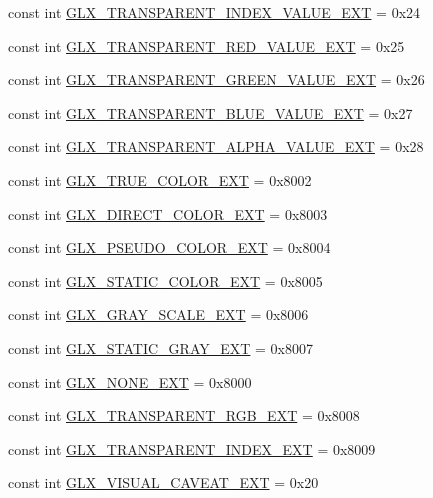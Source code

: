 \begin{DoxyCompactItemize}
const int \hyperlink{class_tao_1_1_platform_1_1_x11_1_1_glx_a1e8f3f9cf583863da934aadd55f7cc7c}{GLX\_\-TRANSPARENT\_\-INDEX\_\-VALUE\_\-EXT} = 0x24
\item 
const int \hyperlink{class_tao_1_1_platform_1_1_x11_1_1_glx_a8c0d163ec64d715d5ee60da7c9b008bc}{GLX\_\-TRANSPARENT\_\-RED\_\-VALUE\_\-EXT} = 0x25
\item 
const int \hyperlink{class_tao_1_1_platform_1_1_x11_1_1_glx_a687072d3336a0824a63a3204b5d0cd37}{GLX\_\-TRANSPARENT\_\-GREEN\_\-VALUE\_\-EXT} = 0x26
\item 
const int \hyperlink{class_tao_1_1_platform_1_1_x11_1_1_glx_a333ee7b32c4683b67f35a39b058c33bd}{GLX\_\-TRANSPARENT\_\-BLUE\_\-VALUE\_\-EXT} = 0x27
\item 
const int \hyperlink{class_tao_1_1_platform_1_1_x11_1_1_glx_ab4ac1b85364d8ebc68fc131daeacaa14}{GLX\_\-TRANSPARENT\_\-ALPHA\_\-VALUE\_\-EXT} = 0x28
\item 
const int \hyperlink{class_tao_1_1_platform_1_1_x11_1_1_glx_a9ccebdda70318edcdb01ec9040546701}{GLX\_\-TRUE\_\-COLOR\_\-EXT} = 0x8002
\item 
const int \hyperlink{class_tao_1_1_platform_1_1_x11_1_1_glx_ab31b0c872736b40dc162d5f05f171147}{GLX\_\-DIRECT\_\-COLOR\_\-EXT} = 0x8003
\item 
const int \hyperlink{class_tao_1_1_platform_1_1_x11_1_1_glx_a7e15ee0e44da343b4ea0eff6b8137a56}{GLX\_\-PSEUDO\_\-COLOR\_\-EXT} = 0x8004
\item 
const int \hyperlink{class_tao_1_1_platform_1_1_x11_1_1_glx_a1eab7def5d1f9ca7f7ca4ce75108a68e}{GLX\_\-STATIC\_\-COLOR\_\-EXT} = 0x8005
\item 
const int \hyperlink{class_tao_1_1_platform_1_1_x11_1_1_glx_a1c8bf824a1ae02d7bae31010865313f2}{GLX\_\-GRAY\_\-SCALE\_\-EXT} = 0x8006
\item 
const int \hyperlink{class_tao_1_1_platform_1_1_x11_1_1_glx_aba49bcbbff3a03176c368da11db5aaae}{GLX\_\-STATIC\_\-GRAY\_\-EXT} = 0x8007
\item 
const int \hyperlink{class_tao_1_1_platform_1_1_x11_1_1_glx_ab4845c9111062972b88a73f6115539a8}{GLX\_\-NONE\_\-EXT} = 0x8000
\item 
const int \hyperlink{class_tao_1_1_platform_1_1_x11_1_1_glx_a5afa705a44c8f37c53f84ae1ca0fdd2b}{GLX\_\-TRANSPARENT\_\-RGB\_\-EXT} = 0x8008
\item 
const int \hyperlink{class_tao_1_1_platform_1_1_x11_1_1_glx_a36d6c7ce71b4e1bb5695d4dea2cd393b}{GLX\_\-TRANSPARENT\_\-INDEX\_\-EXT} = 0x8009
\item 
const int \hyperlink{class_tao_1_1_platform_1_1_x11_1_1_glx_a115fc61ebf65a9448a116a74944299f3}{GLX\_\-VISUAL\_\-CAVEAT\_\-EXT} = 0x20

\end{DoxyCompactItemize}
